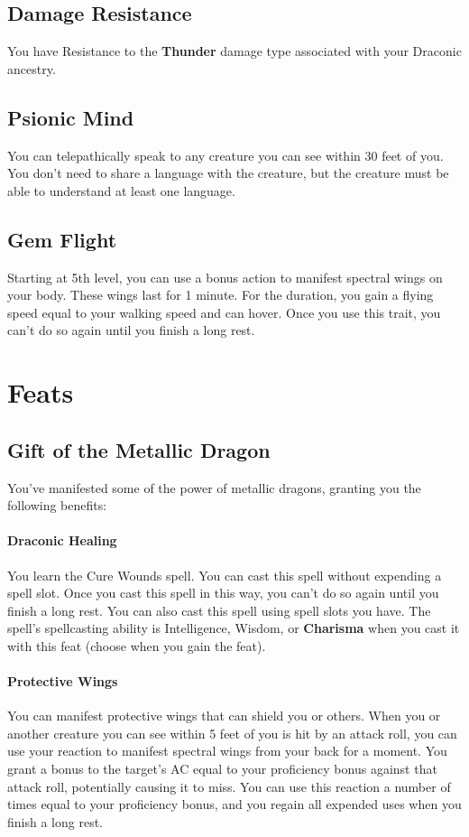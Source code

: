 \documentclass[letterpaper,openany,oneside,twocolumn]{book}
\begin{document}
\subsection*{Damage Resistance}
You have Resistance to the \textbf{Thunder} damage type associated with your Draconic ancestry.
\subsection*{Psionic Mind}
You can telepathically speak to any creature you can see within 30 feet of you. You don't need to share a language with the creature, but the creature must be able to understand at least one language.
\subsection*{Gem Flight}
Starting at 5th level, you can use a bonus action to manifest spectral wings on your body. These wings last for 1 minute. For the duration, you gain a flying speed equal to your walking speed and can hover. Once you use this trait, you can't do so again until you finish a long rest.

\section*{Feats}
\subsection*{Gift of the Metallic Dragon}
You've manifested some of the power of metallic dragons, granting you the following benefits:

\paragraph*{Draconic Healing} You learn the Cure Wounds spell. You can cast this spell without expending a spell slot. Once you cast this spell in this way, you can't do so again until you finish a long rest. You can also cast this spell using spell slots you have. The spell's spellcasting ability is Intelligence, Wisdom, or \textbf{Charisma} when you cast it with this feat (choose when you gain the feat).

\paragraph*{Protective Wings} You can manifest protective wings that can shield you or others. When you or another creature you can see within 5 feet of you is hit by an attack roll, you can use your reaction to manifest spectral wings from your back for a moment. You grant a bonus to the target's AC equal to your proficiency bonus against that attack roll, potentially causing it to miss. You can use this reaction a number of times equal to your proficiency bonus, and you regain all expended uses when you finish a long rest.
\end{document}
